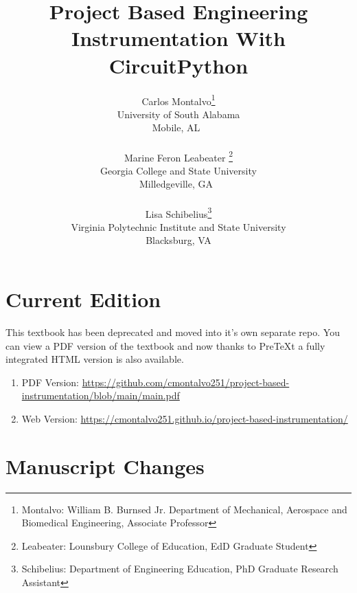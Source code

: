 \documentclass{article}
\begin{document}
\title{Project Based Engineering Instrumentation With CircuitPython}
\author{Carlos Montalvo\footnote{Montalvo: William B. Burnsed Jr. Department of Mechanical, Aerospace and Biomedical Engineering, Associate Professor}
  \\University of South Alabama\\Mobile, AL\ \\ \ \\Marine Feron Leabeater \footnote{Leabeater: Lounsbury College of Education, EdD Graduate Student}\\Georgia College and State University \\ Milledgeville, GA\ \\ \ \\Lisa Schibelius\footnote{Schibelius: Department of Engineering Education, PhD Graduate Research Assistant}\\
Virginia Polytechnic Institute and State University\\Blacksburg, VA}

\maketitle

\linespread{1}

\newpage

\section*{Current Edition}

\noindent This textbook has been deprecated and moved into it's own
separate repo. You can view a PDF version of the textbook and now
thanks to PreTeXt a fully integrated HTML version is also available.
\begin{enumerate}[itemsep=-5pt]
  \item PDF Version:
    \url{https://github.com/cmontalvo251/project-based-instrumentation/blob/main/main.pdf}
  \item Web Version:
    \url{https://cmontalvo251.github.io/project-based-instrumentation/}
\end{enumerate}

\section*{Manuscript Changes}
\end{document}

